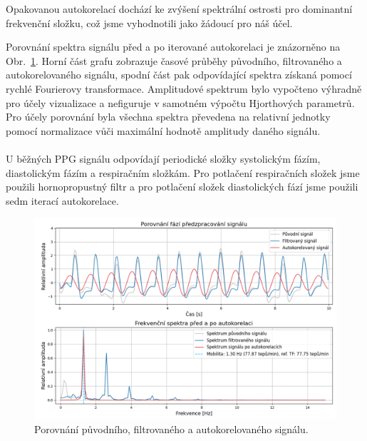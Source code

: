 Opakovanou autokorelací dochází ke zvýšení spektrální ostrosti pro dominantní frekvenční složku, což jsme vyhodnotili jako žádoucí pro náš účel.

Porovnání spektra signálu před a po iterované autokorelaci je znázorněno na Obr.~\ref{fig:hjorth_predzpracovani}.
Horní část grafu zobrazuje časové průběhy původního, filtrovaného a autokorelovaného signálu, spodní část pak odpovídající spektra získaná pomocí rychlé Fourierovy transformace.
Amplitudové spektrum bylo vypočteno výhradně pro účely vizualizace a nefiguruje v samotném výpočtu Hjorthových parametrů.
Pro účely porovnání byla všechna spektra převedena na relativní jednotky pomocí normalizace vůči maximální hodnotě amplitudy daného signálu.

\paragraph{}
U běžných \acs{PPG} signálu odpovídají periodické složky systolickým fázím, diastolickým fázím a respiračním složkám.
Pro potlačení respiračních složek jsme použili hornopropustný filtr a pro potlačení složek diastolických fází jsme použili sedm iterací autokorelace.

\begin{figure}[!th]
	\centering
	\includegraphics[width=1\textwidth]{./obrazky/hjorth_preprocess.png}
	\caption[Porovnání původního, filtrovaného a autokorelovaného signálu]{Porovnání původního, filtrovaného a autokorelovaného signálu.}
	\label{fig:hjorth_predzpracovani}
\end{figure}

